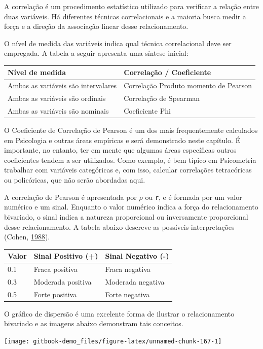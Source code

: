 \documentclass[
]{book}
\begin{document}
A correlação é um procedimento estatístico utilizado para verificar a
relação entre duas variáveis. Há diferentes técnicas correlacionais e a
maioria busca medir a força e a direção da associação linear desse
relacionamento.

O nível de medida das variáveis indica qual técnica correlacional deve
ser empregada. A tabela a seguir apresenta uma síntese inicial:

\begin{longtable}[]{@{}ll@{}}
\toprule
Nível de medida & Correlação / Coeficiente\tabularnewline
\midrule
\endhead
Ambas as variáveis são intervalares & Correlação Produto momento de
Pearson\tabularnewline
Ambas as variáveis são ordinais & Correlação de Spearman\tabularnewline
Ambas as variáveis são nominais & Coeficiente Phi\tabularnewline
\bottomrule
\end{longtable}

O Coeficiente de Correlação de Pearson é um dos mais frequentemente
calculados em Psicologia e outras áreas empíricas e será demonstrado
neste capítulo. É importante, no entanto, ter em mente que algumas áreas
específicas outros coeficientes tendem a ser utilizados. Como exemplo, é
bem típico em Psicometria trabalhar com variáveis categóricas e, com
isso, calcular correlações tetracóricas ou policóricas, que não serão
abordadas aqui.

A correlação de Pearson é apresentada por \(\rho\) ou \texttt{r}, e é
formada por um valor numérico e um sinal. Enquanto o valor numérico
indica a força do relacionamento bivariado, o sinal indica a natureza
proporcional ou inversamente proporcional desse relacionamento. A tabela
abaixo descreve as possíveis interpretações (Cohen,
\protect\hyperlink{ref-Cohen1988}{1988}).

\begin{longtable}[]{@{}lll@{}}
\toprule
Valor & Sinal Positivo (+) & Sinal Negativo (-)\tabularnewline
\midrule
\endhead
0.1 & Fraca positiva & Fraca negativa\tabularnewline
0.3 & Moderada positiva & Moderada negativa\tabularnewline
0.5 & Forte positiva & Forte negativa\tabularnewline
\bottomrule
\end{longtable}

O gráfico de dispersão é uma excelente forma de ilustrar o
relacionamento bivariado e as imagens abaixo demonstram tais conceitos.

\begin{center}\texttt{[image: gitbook-demo\_files/figure-latex/unnamed-chunk-167-1]} \end{center}
\end{document}
